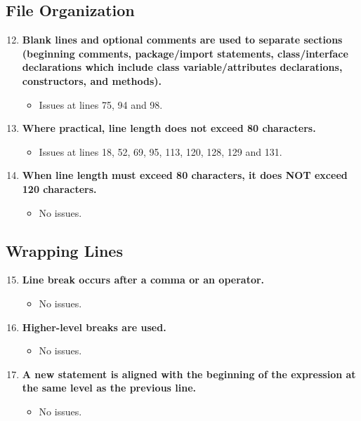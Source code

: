 \documentclass{article}
\begin{document}
		\subsection{File Organization}
			\begin{enumerate}
				\setcounter{enumi}{11}
				\item \textbf{Blank lines and optional comments are used to separate sections (beginning comments, package/import statements, class/interface declarations which include class variable/attributes declarations, constructors, and methods).}
				\begin{itemize}
					\item Issues at lines 75, 94 and 98.
				\end{itemize}
				\item \textbf{Where practical, line length does not exceed 80 characters.}
				\begin{itemize}
					\item Issues at lines 18, 52, 69, 95, 113, 120, 128, 129 and 131.
				\end{itemize}
				\item \textbf{When line length must exceed 80 characters, it does NOT exceed 120 characters.}
				\begin{itemize}
					\item No issues.
				\end{itemize}
			\end{enumerate}
		\subsection{Wrapping Lines}
			\begin{enumerate}
				\setcounter{enumi}{14}
				\item \textbf{Line break occurs after a comma or an operator.}
				\begin{itemize}
					\item No issues.
				\end{itemize}
				\item \textbf{Higher-level breaks are used.}
				\begin{itemize}
					\item No issues.
				\end{itemize}
				\item \textbf{A new statement is aligned with the beginning of the expression at the same level as the previous line.}
				\begin{itemize}
					\item No issues.
				\end{itemize}
			\end{enumerate}
\end{document}
